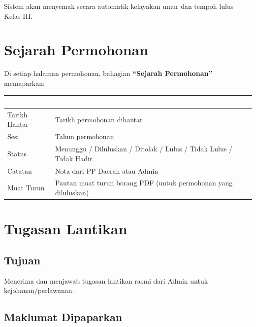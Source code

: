 \documentclass[12pt,a4paper]{report}
\begin{document}
\begin{importantbox}
Sistem akan menyemak secara automatik kelayakan umur dan tempoh lulus Kelas III.
\end{importantbox}

\section{Sejarah Permohonan}

Di setiap halaman permohonan, bahagian \textbf{``Sejarah Permohonan''} memaparkan:

\begin{table}[H]
\centering
{}
\begin{tabularx}{\textwidth}{l X}
\toprule
\rowcolor{tableheader}
\textcolor{white}{\textbf{Lajur}} & \textcolor{white}{\textbf{Penerangan}} \\
\midrule
Tarikh Hantar & Tarikh permohonan dihantar \\
Sesi & Tahun permohonan \\
Status & Menunggu / Diluluskan / Ditolak / Lulus / Tidak Lulus / Tidak Hadir \\
Catatan & Nota dari PP Daerah atau Admin \\
Muat Turun & Pautan muat turun borang PDF (untuk permohonan yang diluluskan) \\
\bottomrule
\end{tabularx}
\end{table}

\section{Tugasan Lantikan}

\subsection{Tujuan}
Menerima dan menjawab tugasan lantikan rasmi dari Admin untuk kejohanan/perlawanan.

\subsection{Maklumat Dipaparkan}
\end{document}
